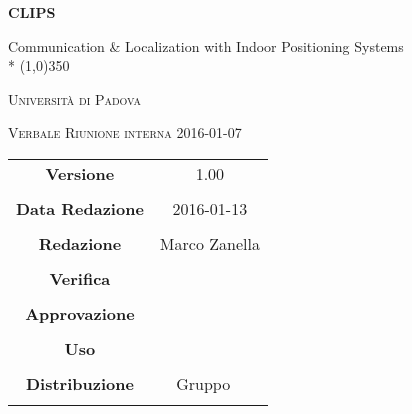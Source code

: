 \documentclass[a4paper,12pt]{article}
\author{Nome Autore}
\date{05/01/2016}
\begin{document}
\begin{titlepage}
	\centering
	{\huge\bfseries CLIPS\par}
	Communication \& Localization with Indoor Positioning Systems \\*
	\line(1,0){350} \\
	{\scshape\LARGE Università di Padova \par}
	\vspace{1cm}
	{\scshape\Large Verbale Riunione interna 2016-01-07\par}
	\vspace{1.5cm}
	\logo
	\vspace{2cm}	
	\vfill \vfill
	\begin{tabular}{c|c}
		{\hfill \textbf{Versione}} 			& 1.00				\\ \\
		{\hfill\textbf{Data Redazione}} 		& 2016-01-13  		\\ \\
		{\hfill\textbf{Redazione}} 			& Marco Zanella		\\ \\
		{\hfill\textbf{Verifica}} 				&  					\\ \\
		{\hfill\textbf{Approvazione}} 		&  					\\ \\
		{\hfill\textbf{Uso}} 					& 					\\ \\
		{\hfill\textbf{Distribuzione}} 			& Gruppo \leaf\		\\ \\
	\end{tabular}
\end{titlepage}
	
	\newpage

	
	\label{LastFrontPage}
	

	\newpage
	
	\pagestyle{mymain}
	
	
		

	
		
	
	
		
	
	
		
				
	\label{LastPage}
\end{document}

